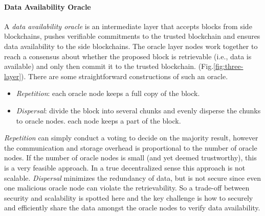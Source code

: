 \documentclass{article}
\begin{document}
\paragraph{Data Availability Oracle}
A \textit{data availability oracle} is an intermediate layer that accepts blocks from side blockchains, pushes verifiable commitments to the trusted blockchain and ensures data availability to the side blockchains. The oracle layer nodes work together to reach a consensus about whether the proposed block is retrievable (i.e., data is available) and only then commit it to the trusted blockchain.  (Fig.\ref{fig:three-layer}). There are some straightforward constructions of such an oracle.
\begin{itemize}
    \item {\em Repetition}: each oracle node keeps a full copy of the block.
    \item {\em Dispersal}: divide the block into several chunks and evenly disperse the chunks to oracle nodes. each node keeps a part of the block.
\end{itemize}
{\em Repetition} can simply conduct a voting to decide on the majority result, however the communication and storage overhead is proportional to the number of oracle nodes. If the number of oracle nodes is small (and yet deemed trustworthy), this is a very feasible approach. In a true decentralized sense this approach is not scalable. {\em Dispersal} minimizes the redundancy of data, but is not secure since even one malicious oracle node can violate the retrievability. So a trade-off between security and scalability is spotted here and the key challenge is how to securely and efficiently share the data amongst the oracle nodes to verify data availability.
\end{document}
